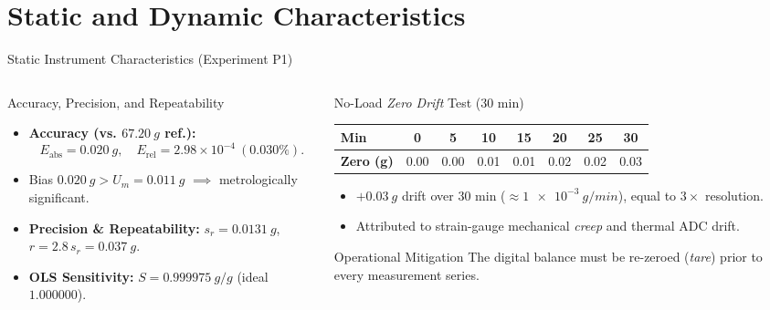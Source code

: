 \documentclass[aspectratio=169,10pt]{beamer}
\newcommand{\sm}{\fontsize{8.2}{10.2}\selectfont}
\newcommand{\xs}{\fontsize{7.1}{9}\selectfont}
\begin{document}
\section{Static and Dynamic Characteristics}

\begin{frame}{Static Instrument Characteristics (Experiment P1)}
\begin{columns}[T,onlytextwidth]
\begin{column}{.49\textwidth}
\begin{block}{Accuracy, Precision, and Repeatability}\sm
\begin{itemize}
\item \textbf{Accuracy (vs. $\SI{67.20}{g}$ ref.):}
  $$E_{\mathrm{abs}} = \SI{0.020}{g}, \quad E_{\mathrm{rel}} = 2.98\times 10^{-4}\ (0.030\%).$$
\item Bias $\SI{0.020}{g} > U_m = \SI{0.011}{g}$ $\implies$ metrologically significant.
\item \textbf{Precision \& Repeatability:} $s_r = \SI{0.0131}{g}$, $r = 2.8\,s_r = \SI{0.037}{g}$.
\item \textbf{OLS Sensitivity:} $S = 0.999975\ \si{g/g}$ (ideal $1.000000$).
\end{itemize}
\end{block}
\end{column}

\begin{column}{.49\textwidth}
\begin{exampleblock}{No-Load \textit{Zero Drift} Test (30 min)}\sm
\centering
\setlength{\tabcolsep}{3.5pt}\begin{tabular}{@{}lccccccc@{}}
\toprule
\textbf{Min} & 0 & 5 & 10 & 15 & 20 & 25 & 30\\
\midrule
\textbf{Zero (g)} & 0.00 & 0.00 & 0.01 & 0.01 & 0.02 & 0.02 & 0.03\\
\bottomrule
\end{tabular}
\par\vspace{2mm}\raggedright
\begin{itemize}
\item $+\SI{0.03}{g}$ drift over $30$ min ($\approx \SI{1e-3}{g/min}$), equal to $3\times$ resolution.
\item Attributed to strain-gauge mechanical \textit{creep} and thermal ADC drift.
\end{itemize}
\end{exampleblock}
\begin{alertblock}{Operational Mitigation}\xs
The digital balance must be re-zeroed (\textit{tare}) prior to every measurement series.
\end{alertblock}
\end{column}
\end{columns}
\end{frame}
\end{document}
